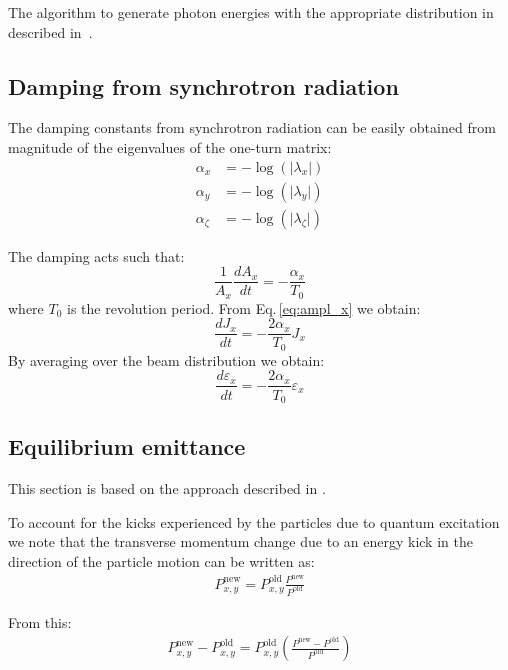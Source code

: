 The algorithm to generate photon energies with the appropriate distribution in described in~\cite{helmut_synrad_90}.



\subsection{Damping from synchrotron radiation}

The damping constants from synchrotron radiation can be easily obtained from magnitude of the eigenvalues of the one-turn matrix:
\begin{align}
\alpha_x &= -\log( \lvert \lambda_x \rvert)\\
\alpha_y &= -\log( \lvert \lambda_y \rvert)\\
\alpha_\zeta &= -\log( \lvert \lambda_\zeta \rvert)
\end{align}

The damping acts such that:
\begin{equation}
\frac{1}{A_x} \frac{dA_x}{dt} = - \frac{\alpha_x}{T_0} 
\end{equation}
where $T_0$ is the revolution period.
From Eq.\,\ref{eq:ampl_x} we obtain:
\begin{equation}
\frac{dJ_x}{dt} = - \frac{2\alpha_x}{T_0}  J_x
\end{equation}
By averaging over the beam distribution we obtain:
\begin{equation}
\frac{d\varepsilon_x}{dt} = - \frac{2\alpha_x}{T_0}  \varepsilon_x
\label{eq:grate_rad_damp}
\end{equation}

\subsection{Equilibrium emittance}

This section is based on the approach described in \cite{chao_eq_emit}.

To account for the kicks experienced by the particles due to quantum excitation we note that the transverse momentum change due to an energy kick in the direction of the particle motion can be written as:
\begin{align}
P_{x,y}^\text{new} = P_{x,y}^\text{old}  \frac{P^\text{new}}{P^\text{old}}
\end{align}

From this:
\begin{align}
P_{x,y}^\text{new} - P_{x,y}^\text{old} = P_{x,y}^\text{old}  \left(\frac{P^\text{new} - P^\text{old}}{P^\text{old}} \right) 
\end{align}


